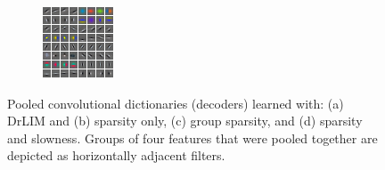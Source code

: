 \begin{figure}[ht]
\begin{subfigure}[b]{\figsize}
\caption{} \label{fig:groupL1filters} \end{subfigure} \hspace{\figspace}
\begin{subfigure}[b]{\figsize}
\includegraphics[width=\textwidth]{./figures/slow/filters_slow.png} \caption{}
\label{fig:slowfilters} \end{subfigure} \caption{Pooled convolutional
dictionaries (decoders) learned with: (a) DrLIM and (b) sparsity only, (c)
group sparsity, and (d) sparsity and slowness. Groups of four features that
were pooled together are depicted as horizontally adjacent filters.}
\label{fig:filters} \end{figure}

